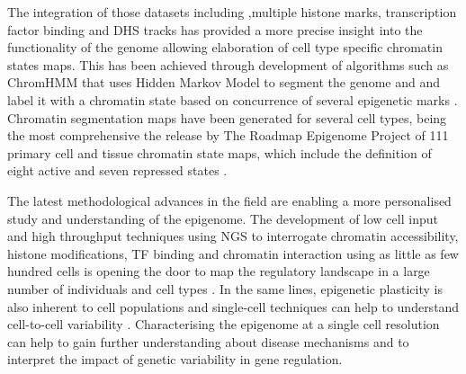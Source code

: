 The integration of those datasets including ,multiple histone marks, transcription factor binding and DHS tracks has provided a more precise insight into the functionality of the genome allowing elaboration of cell type specific chromatin states maps. This has been achieved through development of algorithms such as ChromHMM that uses Hidden Markov Model to segment the genome and and label it with a chromatin state based on concurrence of several epigenetic marks \parencite{Ernst2010,Hoffman2012}. Chromatin segmentation maps have been generated for several cell types, being the most comprehensive the release by The Roadmap Epigenome Project of 111 primary cell and tissue chromatin state maps, which include the definition of eight active and seven repressed states \parencite{Kundaje2015, Ernst2011}. 


The latest methodological advances in the field are enabling a more personalised study and understanding of the epigenome. The development of low cell input and high throughput techniques using NGS to interrogate chromatin accessibility, histone modifications, TF binding and chromatin interaction using as little as few hundred cells is opening the door to map the regulatory landscape in a large number of individuals and cell types \parencite{Buenrostro2013, Schmidl2015,Oudelaar2017}. In the same lines, epigenetic plasticity is also inherent to cell populations and single-cell techniques can help to understand cell-to-cell variability \parencite{Buenrostro2015, Cusanovich2015,Rotem2015,Nagano2013,Smallwood2014}. Characterising the epigenome at a single cell resolution can help to gain further understanding about disease mechanisms and to interpret the impact of genetic variability in gene regulation.

